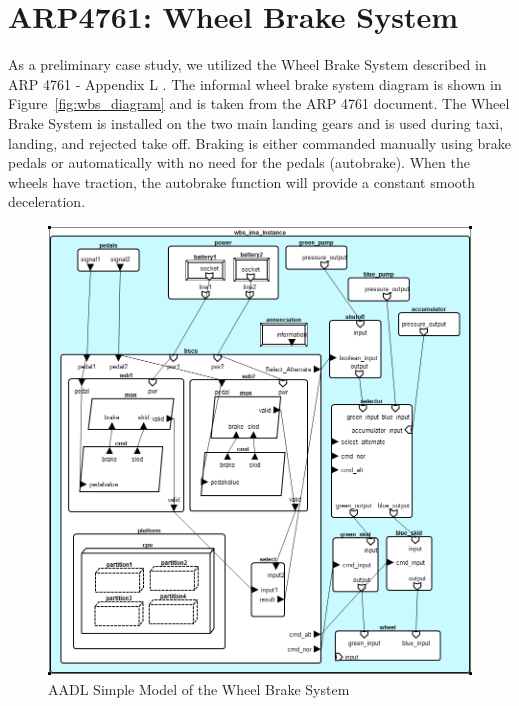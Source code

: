 \section{ARP4761: Wheel Brake System}


As a preliminary case study, we utilized the Wheel Brake System described in ARP 4761 - Appendix L \cite{AIR6110}. The informal wheel brake system diagram is shown in Figure~\ref{fig:wbs_diagram} and is taken from the ARP 4761 document. The Wheel Brake System is installed on the two main landing gears and is used during taxi, landing, and rejected take off. Braking is either commanded manually using brake pedals or automatically with no need for the pedals (autobrake). When the wheels have traction, the autobrake function will provide a constant smooth deceleration. \\

\begin{figure}
\begin{center}
\includegraphics[scale=.5]{images/Wbs-ima.png}
\caption{AADL Simple Model of the Wheel Brake System }\label{fig:wbs_ima}
\end{center}
\end{figure}


